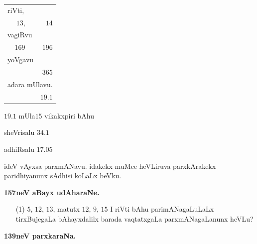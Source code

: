 \medskip

\begin{tabular}{rr}
\multicolumn{2}{l}{riVti,}\\
$13$, & $14$\\[5pt]
\multicolumn{2}{l}{vagiRvu}\\
$169$ & $196$\\[5pt]
\multicolumn{2}{l}{yoVgavu}\\
 & $365$\\[5pt]
\multicolumn{2}{l}{adara mUlavu.}\\
 & $19.1$
\end{tabular}

\medskip

$19.1$ mUla\qquad $15$ vikakxpiri bAhu

sheVrisalu $34.1$

adhiRsalu $17.05$

ideV vAyxsa parxmANavu. idakekx muMce heVLiruva parxkArakekx
paridhiyanunx sAdhisi koLaLx beVku.

\medskip
\begin{center}
{\large\bf 157neV aBayx udAharaNe.}
\end{center}

\begin{itemize}
\item[\rm(1)] $5$, $12$, $13$, matutx $12$, $9$, $15$ I riVti bAhu
parimANagaLuLaLx tirxBujegaLa bAhayxdalilx barada vaqtatxgaLa
parxmANagaLanunx heVLu?
\end{itemize}

\newpage

\begin{center}
{\bf\LARGE 139neV parxkaraNa.}\\
\end{center}

